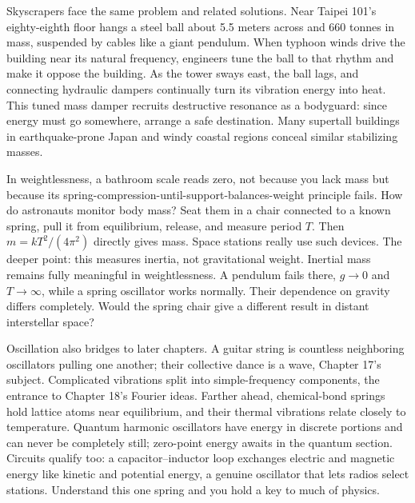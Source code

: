 Skyscrapers face the same problem and related solutions. Near Taipei 101's eighty-eighth floor hangs a steel ball about 5.5 meters across and 660 tonnes in mass, suspended by cables like a giant pendulum. When typhoon winds drive the building near its natural frequency, engineers tune the ball to that rhythm and make it oppose the building. As the tower sways east, the ball lags, and connecting hydraulic dampers continually turn its vibration energy into heat. This tuned mass damper recruits destructive resonance as a bodyguard: since energy must go somewhere, arrange a safe destination. Many supertall buildings in earthquake-prone Japan and windy coastal regions conceal similar stabilizing masses.


\begin{thought}
In weightlessness, a bathroom scale reads zero, not because you lack mass but because its spring-compression-until-support-balances-weight principle fails. How do astronauts monitor body mass? Seat them in a chair connected to a known spring, pull it from equilibrium, release, and measure period \(T\). Then \(m=kT^{2}/(4\pi^{2})\) directly gives mass. Space stations really use such devices. The deeper point: this measures inertia, not gravitational weight. Inertial mass remains fully meaningful in weightlessness. A pendulum fails there, \(g\to0\) and \(T\to\infty\), while a spring oscillator works normally. Their dependence on gravity differs completely. Would the spring chair give a different result in distant interstellar space?
\end{thought}

Oscillation also bridges to later chapters. A guitar string is countless neighboring oscillators pulling one another; their collective dance is a wave, Chapter 17's subject. Complicated vibrations split into simple-frequency components, the entrance to Chapter 18's Fourier ideas. Farther ahead, chemical-bond springs hold lattice atoms near equilibrium, and their thermal vibrations relate closely to temperature. Quantum harmonic oscillators have energy in discrete portions and can never be completely still; zero-point energy awaits in the quantum section. Circuits qualify too: a capacitor--inductor loop exchanges electric and magnetic energy like kinetic and potential energy, a genuine oscillator that lets radios select stations. Understand this one spring and you hold a key to much of physics.

